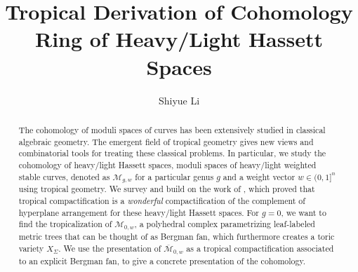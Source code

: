 \documentclass[mathematics]{hmcthesis}
\title{Tropical Derivation of Cohomology Ring of Heavy/Light Hassett Spaces}
\author{Shiyue Li}
\newcommand{\calm}{\mathcal{M}}
\begin{document}
\frontmatter

\maketitle


\begin{abstract}
    The cohomology of moduli spaces of curves has been extensively studied in classical algebraic geometry. 
    The emergent field of tropical geometry gives new views and combinatorial tools for treating these classical problems. 
	In particular, we study the cohomology of heavy/light Hassett spaces, moduli spaces of heavy/light weighted stable curves,
	denoted as $\calm_{g, w}$ for a particular genus $g$
	and a weight vector $w \in (0, 1]^n$
	using tropical geometry.
	We survey and build on the work of \citet{Cavalieri2014},
	which proved that tropical compactification 
    is a \textit{wonderful} compactification of the complement of hyperplane arrangement 
	for these heavy/light Hassett spaces.
	For $g = 0$, we want to find the tropicalization of 
	$\calm_{0, w}$,
	a polyhedral complex parametrizing leaf-labeled metric trees 
	that can be thought of as Bergman fan,
	which furthermore creates a toric variety $X_{\Sigma}$.
	We use the presentation of $\overline{\calm}_{0,w}$ as a tropical compactification associated to an explicit Bergman fan, to give a concrete presentation of the cohomology. 
\end{abstract}

\tableofcontents 
\listoffigures
\listoftables
\end{document}
